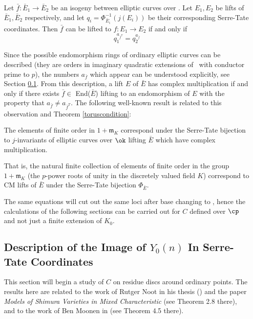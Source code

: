 \documentclass[12pt,letterpaper]{article}
\begin{document}
	\begin{thm}\label{toruscondition}
		Let $\bar{f}\colon\bar{E}_1\to \bar{E}_2$ be an isogeny between elliptic curves over \fpbar. Let $E_1,E_2$ be lifts of $\bar{E}_1, \bar{E}_2$ respectively, and let $q_i = \Phi_{\bar{E}_i}^{-1}(j(E_i))$ be their corresponding Serre-Tate coordinates. Then $\bar{f}$ can be lifted to $f\colon E_1\to E_2$ if and only if 
		\[q_1^{a_{\bar{f}^T}} = q_2^{a_{\bar{f}}}\]
	\end{thm}
	
	Since the possible endomorphism rings of ordinary elliptic curves can be described (they are orders in imaginary quadratic extensions of \kew\ with conductor prime to $p$), the numbers $a_{\bar{f}}$ which appear can be understood explicitly, see Section \ref{ModularCurves}. From this description, a lift $E$ of $\bar{E}$ has complex multiplication if and only if there exists $\bar{f}\in$ End($\bar{E}$) lifting to an endomorphism of $E$ with the property that $a_{\bar{f}}\ne a_{\bar{f}^T}$. The following well-known result is related to this observation and Theorem \ref{toruscondition}:
	
	\begin{thm}
		The elements of finite order in $1+\mathfrak{m}_K$ correspond under the Serre-Tate bijection to $j$-invariants of elliptic curves over $\ok$ lifting $\bar{E}$ which have complex multiplication.
	\end{thm} 
	
	 That is, the natural finite collection of elements of finite order in the group $1+\mathfrak{m}_K$ (the $p$-power roots of unity in the discretely valued field $K$) correspond to CM lifts of $\bar{E}$ under the Serre-Tate bijection $\Phi_{\bar{E}}$.
	
	
	The same equations will cut out the same loci after base changing to \cp, hence the calculations of the following sections can be carried out for $C$ defined over $\cp$ and not just a finite extension of $K_0$.
	
	
	
	
	
	
	
	
	\subsection{Description of the Image of $Y_0(n)$ In Serre-Tate Coordinates}\label{ModularCurves}
	
	This section will begin a study of $C$ on residue discs around ordinary points. The results here are related to the work of Rutger Noot in his thesis (\cite{Noo96}) and the paper \textit{Models of Shimura Varieties in Mixed Characteristic} (see Theorem 2.8 there), and to the work of Ben Moonen in \cite{Moo98II} (see Theorem 4.5 there).
	
\end{document}
